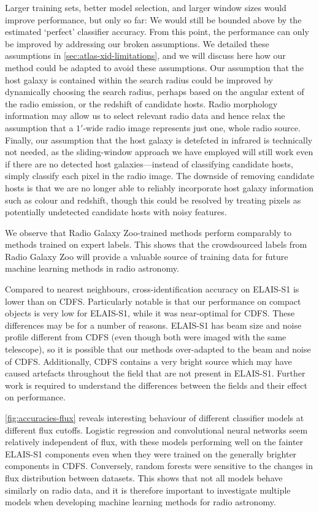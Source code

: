   Larger training sets, better model selection, and larger window sizes would
  improve performance, but only so far: We would still be bounded above by the
  estimated `perfect' classifier accuracy. From this point, the performance
  can only be improved by addressing our broken assumptions. We detailed
  these assumptions in \autoref{sec:atlas-xid-limitations}, and we will discuss here how
  {our method could be adapted to avoid these assumptions}. Our assumption that the host galaxy is contained
  within the search radius could be improved by dynamically choosing the
  search radius, perhaps based on the angular extent of the radio emission, or the
  redshift of candidate hosts. Radio morphology information may allow us to
  select relevant radio data and hence relax the assumption that a $1'$-wide
  radio image represents just one, whole radio source. Finally, our assumption
  that the host galaxy is detefcted in infrared is technically not needed, as
  the sliding-window approach we have employed will still work even if there
  are no detected host galaxies---instead of classifying candidate hosts,
  simply classify each pixel in the radio image. The downside of removing
  candidate hosts is that we are no longer able to reliably incorporate host
  galaxy information such as colour and redshift, though this could be
  resolved by treating pixels as potentially undetected candidate hosts with
  noisy features.

  We observe that Radio Galaxy Zoo-trained methods perform comparably to
  methods trained on expert labels. This shows that the crowdsourced labels
  from Radio Galaxy Zoo will provide a valuable source of training
  data for future machine learning methods in radio astronomy.

  Compared to nearest neighbours, cross-identification accuracy on ELAIS-S1 is
  lower than on CDFS. Particularly notable is that our performance on compact
  objects is very low for ELAIS-S1, while it was near-optimal for CDFS. These
  differences may be for a number of reasons. ELAIS-S1 has beam size and noise
  profile different from CDFS (even though both were imaged with the same
  telescope), so it is possible that our methods over-adapted to the beam and
  noise of CDFS. Additionally, CDFS contains a very bright source which may
  have caused artefacts throughout the field that are not present in ELAIS-S1.
  Further work is required to understand the differences between the fields
  and their effect on performance.

  \autoref{fig:accuracies-flux} reveals interesting behaviour of different
  classifier models at different flux cutoffs. Logistic regression and
  convolutional neural networks seem relatively independent of flux, with
  these models performing well on the fainter ELAIS-S1 components even when
  they were trained on the generally brighter components in CDFS. Conversely,
  random forests were sensitive to the changes in flux distribution between
  datasets. This shows that not all models behave similarly on radio data,
  and it is therefore important to investigate multiple models when
  developing machine learning methods for radio astronomy.

